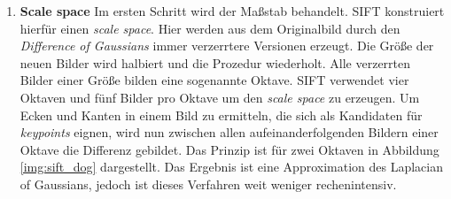\begin{enumerate}
	\item \textbf{Scale space} Im ersten Schritt wird der Maßstab behandelt. SIFT konstruiert hierfür einen \textit{scale space}. Hier werden aus dem Originalbild durch den \textit{Difference of Gaussians} immer verzerrtere Versionen erzeugt. Die Größe der neuen Bilder wird halbiert und die Prozedur wiederholt. Alle verzerrten Bilder einer Größe bilden eine sogenannte Oktave. SIFT verwendet vier Oktaven und fünf Bilder pro Oktave um den \textit{scale space} zu erzeugen. Um Ecken und Kanten in einem Bild zu ermitteln, die sich als Kandidaten für \textit{keypoints} eignen, wird nun zwischen allen aufeinanderfolgenden Bildern einer Oktave die Differenz gebildet. Das Prinzip ist für zwei Oktaven in Abbildung \ref{img:sift_dog} dargestellt. Das Ergebnis ist eine Approximation des Laplacian of Gaussians, jedoch ist dieses Verfahren weit weniger rechenintensiv. 


\end{enumerate}
